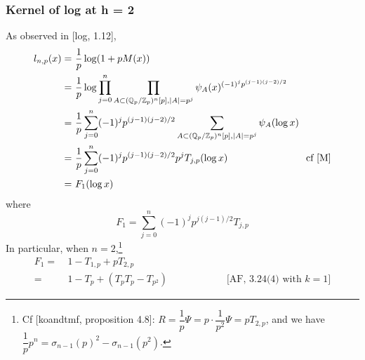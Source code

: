 \documentclass{rs}
\theoremstyle{definition}
\theoremstyle{remark}
\newcommand{\mb}[1]{\mathbb{#1}}
\newcommand{\BQ}{{\mb Q}}
\newcommand{\BZ}{{\mb Z}}
\newcommand{\si}{\sigma}
\renewcommand{\=}{\approx}
\renewcommand{\-}{\sim}
\numberwithin{equation}{section}
\numberwithin{thm}{section}
\begin{document}
\subsubsection{Kernel of log at h = 2}
\label{subsubsec:kerlog}

As observed in [log, 1.12], 
\begin{equation*}
 \begin{split}
  l_{n,p}(x) = & ~ \frac{1}{p} \log (1 + p M(x)) \\
             = & ~ \frac{1}{p} \log \prod_{j = 0}^n \prod_{A \subset (\BQ_p/\BZ_p)^n [p], |A| = p^j} \psi_A(x)^{(-1)^j p^{(j - 1) (j - 2) / 2}} \\
             = & ~ \frac{1}{p} \sum_{j = 0}^n (-1)^j p^{(j - 1) (j - 2) / 2} \sum_{A \subset (\BQ_p/\BZ_p)^n [p], |A| = p^j} \psi_A(\log x) \\
             = & ~ \frac{1}{p} \sum_{j = 0}^n (-1)^j p^{(j - 1) (j - 2) / 2} p^j T_{j,p}(\log x) \qquad\qquad\qquad\qquad \text{cf \eqref{M}} \\
             = & ~ F_1 (\log x) 
 \end{split}
\end{equation*}
where 
\[
 F_1 = \sum_{j = 0}^n (-1)^j p^{j (j - 1) / 2} T_{j,p} 
\]
In particular, when $n = 2$,\footnote{Cf [koandtmf, proposition 4.8]: 
$R = \dfrac{1}{p} \Psi = p \cdot \dfrac{1}{p^2} \Psi = p T_{2,p}$, 
and we have $\dfrac{1}{p} p^n = \si_{n-1}(p)^2 - \si_{n-1}(p^2)$.  } 
\begin{equation*}
 \begin{split}
  F_1 = & ~ 1 - T_{1,p} + p T_{2,p} \\
      = & ~ 1 - T_p + (T_p T_p - T_{p^2}) \qquad\qquad\qquad \text{[AF, 3.24(4) with $k = 1$]} 
 \end{split}
\end{equation*}
\end{document}
